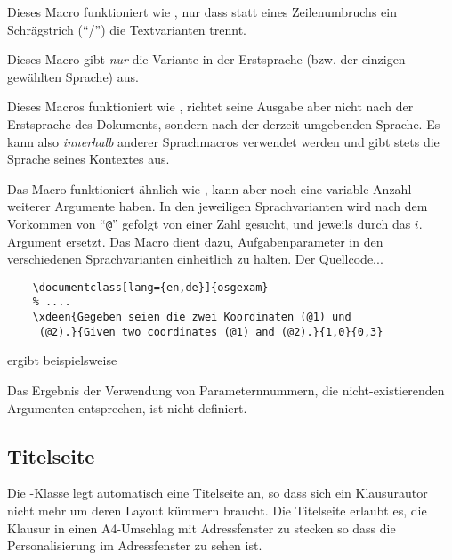 \documentclass[
load=osgexam,
babel=ngerman
]{skdoc}
\begin{document}
\DescribeMacro{}Dieses Macro funktioniert wie
, nur dass statt eines Zeilenumbruchs ein Schrägstrich (``/'') die Textvarianten trennt.
\medskip

\DescribeMacro{}Dieses Macro gibt \emph{nur} die
Variante in der Erstsprache (bzw. der einzigen gewählten Sprache) aus.
\medskip

\DescribeMacro{}Dieses Macros funktioniert wie
, richtet seine Ausgabe aber nicht nach der Erstsprache des Dokuments, sondern nach der derzeit umgebenden
Sprache. Es kann also \emph{innerhalb} anderer Sprachmacros verwendet werden und gibt stets die Sprache seines Kontextes
aus.
\medskip

\DescribeMacro{} %
  Das Macro  funktioniert ähnlich wie , kann aber noch eine variable Anzahl weiterer Argumente
  haben. In den jeweiligen Sprachvarianten wird nach dem Vorkommen von ``\verb!@!'' gefolgt von einer Zahl 
  gesucht, und jeweils durch das $i$. Argument ersetzt. Das Macro dient dazu, Aufgabenparameter in den verschiedenen
  Sprachvarianten einheitlich zu halten.
  Der Quellcode...
  \begin{lstlisting}
    \documentclass[lang={en,de}]{osgexam}
    % ....
    \xdeen{Gegeben seien die zwei Koordinaten (@1) und
     (@2).}{Given two coordinates (@1) and (@2).}{1,0}{0,3}
  \end{lstlisting}
\noindent  ergibt beispielsweise

\noindent{}
\medskip

Das Ergebnis der Verwendung von Parameternnummern, die nicht-existierenden Argumenten entsprechen, ist nicht definiert.
\subsection{Titelseite}
\label{sec:macro:title}
Die \thepkg-Klasse legt automatisch eine Titelseite an, so dass sich ein Klausurautor nicht mehr um deren Layout kümmern
braucht.
Die Titelseite erlaubt es, die Klausur in einen A4-Umschlag mit Adressfenster zu stecken so dass die Personalisierung im
Adressfenster zu sehen ist.
\end{document}
